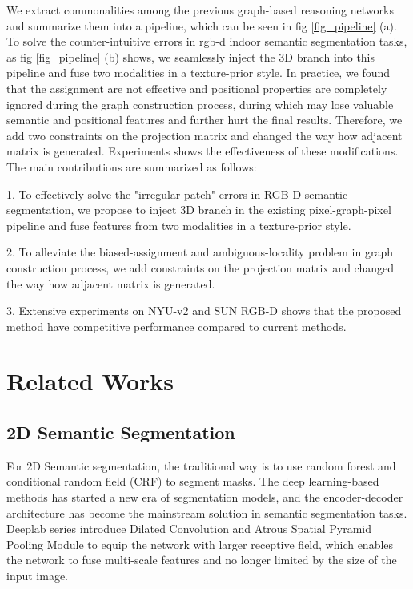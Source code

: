 \documentclass[journal]{IEEEtran}
\begin{document}
 
    We extract commonalities among the previous graph-based reasoning networks and summarize them into a pipeline, which can be seen in fig \ref{fig_pipeline} (a). To solve the counter-intuitive errors in rgb-d indoor semantic segmentation tasks, as fig \ref{fig_pipeline} (b) shows, we seamlessly inject the 3D branch into this pipeline and fuse two modalities in a texture-prior style. In practice, we found that the assignment are not effective and positional properties are completely ignored during the graph construction process, during which may lose valuable semantic and positional features and further hurt the final results. Therefore, we add two constraints on the projection matrix and changed the way how adjacent matrix is generated. Experiments shows the effectiveness of these modifications. \\   
    
     
    The main contributions are summarized as follows: 

    1. To effectively solve the "irregular patch" errors in RGB-D semantic segmentation, we propose to inject 3D branch in the existing pixel-graph-pixel pipeline and fuse features from two modalities in a texture-prior style.
    
    2. To alleviate the biased-assignment and ambiguous-locality problem in graph construction process, we add constraints on the projection matrix and changed the way how adjacent matrix is generated.

    3. Extensive experiments on NYU-v2 and SUN RGB-D shows that the proposed method have competitive performance compared to current methods.\\   

\section{Related Works} \label{sec_related}

\subsection{2D Semantic Segmentation}

 
    For 2D Semantic segmentation, the traditional way is to use random forest and conditional random field (CRF) to segment masks. The deep learning-based methods \cite{long2015fully} has started a new era of segmentation models, and the encoder-decoder architecture has become the mainstream solution in semantic segmentation tasks\cite{unet}. Deeplab series\cite{chen2017deeplab}\cite{cheng2020panoptic} introduce Dilated Convolution and Atrous Spatial Pyramid Pooling Module to equip the network with larger receptive field, which enables the network to fuse multi-scale features and no longer limited by the size of the input image. \\   
    
\end{document}

